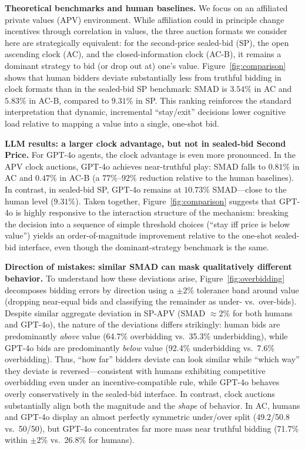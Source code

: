 \textbf{Theoretical benchmarks and human baselines.}
We focus on an affiliated private values (APV) environment. While affiliation could in principle change incentives through correlation in values, the three auction formats we consider here are strategically equivalent: for the second-price sealed-bid (SP), the open ascending clock (AC), and the closed-information clock (AC-B), it remains a dominant strategy to bid (or drop out at) one’s value. Figure~\ref{fig:comparison} shows that human bidders deviate substantially less from truthful bidding in clock formats than in the sealed-bid SP benchmark: SMAD is $3.54\%$ in AC and $5.83\%$ in AC-B, compared to $9.31\%$ in SP. This ranking reinforces the standard interpretation that dynamic, incremental ``stay/exit'' decisions lower cognitive load relative to mapping a value into a single, one-shot bid.


\textbf{LLM results: a larger clock advantage, but not in sealed-bid Second Price.}
For GPT-4o agents, the clock advantage is even more pronounced. In the APV clock auctions, GPT-4o achieves near-truthful play: SMAD falls to $0.81\%$ in AC and $0.47\%$ in AC-B (a $77\%$--$92\%$ reduction relative to the human baselines). 
In contrast, in sealed-bid SP, GPT-4o remains at $10.73\%$ SMAD—close to the human level ($9.31\%$). 
Taken together, Figure~\ref{fig:comparison} suggests that GPT-4o is highly responsive to the interaction structure of the mechanism: breaking the decision into a sequence of simple threshold choices (``stay iff price is below value'') yields an order-of-magnitude improvement relative to the one-shot sealed-bid interface, even though the dominant-strategy benchmark is the same.

\textbf{Direction of mistakes: similar SMAD can mask qualitatively different behavior.}
To understand how these deviations arise, Figure~\ref{fig:overbidding} decomposes bidding errors by direction using a $\pm 2\%$ tolerance band around value (dropping near-equal bids and classifying the remainder as under- vs.\ over-bids). Despite similar aggregate deviation in SP-APV (SMAD $\approx 2\%$ for both humans and GPT-4o), the nature of the deviations differs strikingly: human bids are predominantly \emph{above} value (64.7\% overbidding vs.\ 35.3\% underbidding), while GPT-4o bids are predominantly \emph{below} value (92.4\% underbidding vs.\ 7.6\% overbidding). Thus, ``how far'' bidders deviate can look similar while ``which way'' they deviate is reversed—consistent with humans exhibiting competitive overbidding even under an incentive-compatible rule, while GPT-4o behaves overly conservatively in the sealed-bid interface.
In contrast, clock auctions substantially align both the magnitude and the \emph{shape} of behavior. In AC, humans and GPT-4o display an almost perfectly symmetric under/over split (49.2/50.8 vs.\ 50/50), but GPT-4o concentrates far more mass near truthful bidding (71.7\% within $\pm 2\%$ vs.\ 26.8\% for humans).


